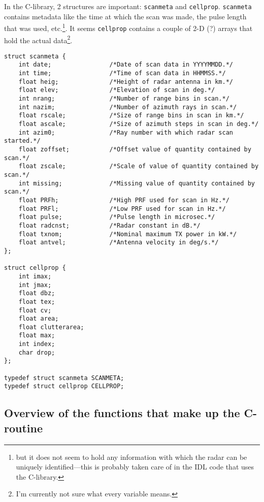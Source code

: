In the C-library, 2 structures are important: \texttt{scanmeta} and \texttt{cellprop}. \texttt{scanmeta} contains metadata like the time at which the scan was made, the pulse length that was used, etc.\footnote{but it does not seem to hold any information with which the radar can be uniquely identified---this is probably taken care of in the IDL code that uses the C-library.}. It seems \texttt{cellprop} contains a couple of 2-D (?) arrays that hold the actual data\footnote{I'm currently not sure what every variable means.}.

\begin{verbatim}
struct scanmeta {
    int date;                /*Date of scan data in YYYYMMDD.*/
    int time;                /*Time of scan data in HHMMSS.*/
    float heig;              /*Height of radar antenna in km.*/
    float elev;              /*Elevation of scan in deg.*/
    int nrang;               /*Number of range bins in scan.*/
    int nazim;               /*Number of azimuth rays in scan.*/
    float rscale;            /*Size of range bins in scan in km.*/
    float ascale;            /*Size of azimuth steps in scan in deg.*/
    int azim0;               /*Ray number with which radar scan started.*/
    float zoffset;           /*Offset value of quantity contained by scan.*/
    float zscale;            /*Scale of value of quantity contained by scan.*/
    int missing;             /*Missing value of quantity contained by scan.*/
    float PRFh;              /*High PRF used for scan in Hz.*/
    float PRFl;              /*Low PRF used for scan in Hz.*/
    float pulse;             /*Pulse length in microsec.*/
    float radcnst;           /*Radar constant in dB.*/
    float txnom;             /*Nominal maximum TX power in kW.*/
    float antvel;            /*Antenna velocity in deg/s.*/
};

struct cellprop {
    int imax;
    int jmax;
    float dbz;
    float tex;
    float cv;
    float area;
    float clutterarea;
    float max;
    int index;
    char drop;
};

typedef struct scanmeta SCANMETA;
typedef struct cellprop CELLPROP;

\end{verbatim}

\subsection{Overview of the functions that make up the C-routine}

